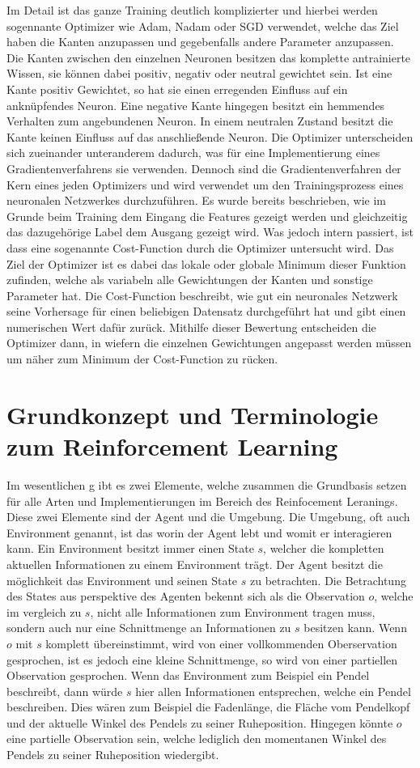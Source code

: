 \documentclass[]{iat}
\begin{document}
Im Detail ist das ganze Training deutlich komplizierter und hierbei werden sogennante Optimizer wie Adam, Nadam oder SGD verwendet, welche das Ziel haben die Kanten anzupassen und gegebenfalls andere Parameter anzupassen. Die Kanten zwischen den einzelnen Neuronen besitzen das komplette antrainierte Wissen, sie können dabei positiv, negativ oder neutral gewichtet sein. Ist eine Kante positiv Gewichtet, so hat sie einen erregenden Einfluss auf ein anknüpfendes Neuron. Eine negative Kante hingegen besitzt ein hemmendes Verhalten zum angebundenen Neuron. In einem neutralen Zustand besitzt die Kante keinen Einfluss auf das anschließende Neuron. Die Optimizer unterscheiden sich zueinander unteranderem dadurch, was für eine Implementierung eines Gradientenverfahrens sie verwenden. Dennoch sind die Gradientenverfahren der Kern eines jeden Optimizers und wird verwendet um den Trainingsprozess eines neuronalen Netzwerkes durchzuführen. Es wurde bereits beschrieben, wie im Grunde beim Training dem Eingang die Features gezeigt werden und gleichzeitig das dazugehörige Label dem Ausgang gezeigt wird. Was jedoch intern passiert, ist dass eine sogenannte Cost-Function durch die Optimizer untersucht wird. Das Ziel der Optimizer ist es dabei das lokale oder globale Minimum dieser Funktion zufinden, welche als variabeln alle Gewichtungen der Kanten und sonstige Parameter hat. Die Cost-Function beschreibt, wie gut ein neuronales Netzwerk seine Vorhersage für einen beliebigen Datensatz durchgeführt hat und gibt einen numerischen Wert dafür zurück. Mithilfe dieser Bewertung entscheiden die Optimizer dann, in wiefern die einzelnen Gewichtungen angepasst werden müssen um näher zum Minimum der Cost-Function zu rücken.

\section{Grundkonzept und Terminologie zum Reinforcement Learning}
Im wesentlichen g ibt es zwei Elemente, welche zusammen die Grundbasis setzen für alle Arten und Implementierungen im Bereich des Reinfocement Leranings. Diese zwei Elemente sind der Agent und die Umgebung. Die Umgebung, oft auch Environment genannt, ist das worin der Agent lebt und womit er interagieren kann. Ein Environment besitzt immer einen State $s$, welcher die kompletten aktuellen Informationen zu einem Environment trägt. Der Agent besitzt die möglichkeit das Environment und seinen State $s$ zu betrachten. Die Betrachtung des States aus perspektive des Agenten bekennt sich als die Observation $o$, welche im vergleich zu $s$, nicht alle Informationen zum Environment tragen muss, sondern auch nur eine Schnittmenge an Informationen zu $s$ besitzen kann. Wenn $o$ mit $s$ komplett übereinstimmt, wird von einer vollkommenden Oberservation gesprochen, ist es jedoch eine kleine Schnittmenge, so wird von einer partiellen Observation gesprochen. Wenn das Environment zum Beispiel ein Pendel beschreibt, dann würde $s$ hier allen Informationen entsprechen, welche ein Pendel beschreiben. Dies wären zum Beispiel die Fadenlänge, die Fläche vom Pendelkopf und der aktuelle Winkel des Pendels zu seiner Ruheposition. Hingegen könnte $o$ eine partielle Observation sein, welche lediglich den momentanen Winkel des Pendels zu seiner Ruheposition wiedergibt.
\end{document}
